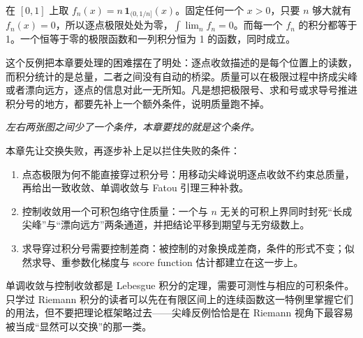 在 \([0,1]\) 上取 \(f_n(x)=n\,\mathbf1_{(0,1/n]}(x)\)。固定任何一个 \(x>0\)，只要 \(n\) 够大就有 \(f_n(x)=0\)，所以逐点极限处处为零，\(\int\lim_n f_n=0\)。而每一个 \(f_n\) 的积分都等于 1。一个恒等于零的极限函数和一列积分恒为 1 的函数，同时成立。

这个反例把本章要处理的困难摆在了明处：逐点收敛描述的是每个位置上的读数，而积分统计的是总量，二者之间没有自动的桥梁。质量可以在极限过程中挤成尖峰或者漂向远方，逐点的信息对此一无所知。凡是想把极限号、求和号或求导号推进积分号的地方，都要先补上一个额外条件，说明质量跑不掉。

\begin{center}
\end{center}

\emph{左右两张图之间少了一个条件，本章要找的就是这个条件。}

本章先让交换失败，再逐步补上足以拦住失败的条件：

\begin{enumerate}
\tightlist
\item
  点态极限为何不能直接穿过积分号：用移动尖峰说明逐点收敛不约束总质量，再给出一致收敛、单调收敛与 Fatou 引理三种补救。
\item
  控制收敛用一个可积包络守住质量：一个与 \(n\) 无关的可积上界同时封死``长成尖峰''与``漂向远方''两条通道，并把结论平移到期望与无穷级数上。
\item
  求导穿过积分号需要控制差商：被控制的对象换成差商，条件的形式不变；似然求导、重参数化梯度与 score function 估计都建立在这一步上。
\end{enumerate}

单调收敛与控制收敛都是 Lebesgue 积分的定理，需要可测性与相应的可积条件。只学过 Riemann 积分的读者可以先在有限区间上的连续函数这一特例里掌握它们的用法，但不要把理论框架略过去——尖峰反例恰恰是在 Riemann 视角下最容易被当成``显然可以交换''的那一类。

